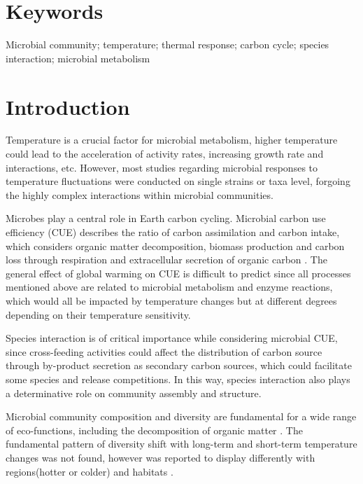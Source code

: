 \documentclass[11pt, a4paper]{article}
\begin{document}
\begin{spacing}{1.5}

\linenumbers
\renewcommand\thesection{\arabic{section}}
\section{Keywords}
Microbial community; temperature; thermal response; carbon cycle; species interaction; microbial metabolism
\section{Introduction}

Temperature is a crucial factor for microbial metabolism, higher temperature could lead to the acceleration of activity rates, increasing growth rate and interactions, etc. However, most studies regarding microbial responses to temperature fluctuations were conducted on single strains or taxa level, forgoing the highly complex interactions within microbial communities. 

Microbes play a central role in Earth carbon cycling. Microbial carbon use efficiency (CUE) describes the ratio of carbon assimilation and carbon intake, which considers organic matter decomposition, biomass production and carbon loss through respiration and extracellular secretion of organic carbon \citep{bardgett2008microbial}. The general effect of global warming on CUE is difficult to predict since all processes mentioned above are related to microbial metabolism and enzyme reactions, which would all be impacted by temperature changes \citep{davidson2006temperature, smith2019community, gang2019meta} but at different degrees depending on their temperature sensitivity. 

Species interaction is of critical importance while considering microbial CUE, since cross-feeding activities could affect the distribution of carbon source through by-product secretion as secondary carbon sources, which could facilitate some species and release competitions. In this way, species interaction also plays a determinative role on community assembly and structure.

Microbial community composition and diversity are fundamental for a wide range of eco-functions, including the decomposition of organic matter \citep{liebich2007degradation, perveen2014priming}. The fundamental pattern of diversity shift with long-term and short-term temperature changes was not found, however was reported to display differently with regions(hotter or colder) and habitats \citep{zhou2016temperature, zhou2020meta, luo2019seasonal, gilbert2012defining}.


\end{spacing}
\end{document}
